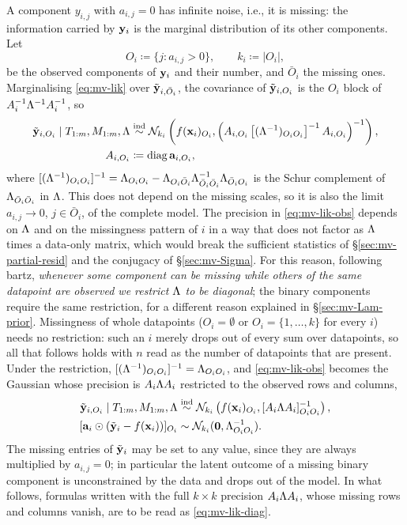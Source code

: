 A component $y_{i,j}$ with $a_{i,j} = 0$ has infinite noise, i.e., it is
missing: the information carried by $\mathbf{y}_i$ is the marginal distribution of
its other components. Let
\begin{equation}
	\label{eq:mv-Oi}
	O_i \coloneqq \{j : a_{i,j} > 0\},
	\qquad
	k_i \coloneqq |O_i|,
\end{equation}
be the observed components of $\mathbf{y}_i$ and their number, and $\bar O_i$ the
missing ones. Marginalising \eqref{eq:mv-lik} over $\tilde{\mathbf{y}}_{i,\bar O_i}$, the
covariance of $\tilde{\mathbf{y}}_{i,O_i}$ is the $O_i$ block of
$A_i^{-1}\Lambda^{-1}A_i^{-1}$, so
\begin{align}
	\label{eq:mv-lik-obs}
	\tilde{\mathbf{y}}_{i,O_i} \mid T_{1:m}, M_{1:m}, \Lambda & \stackrel{\text{ind}}{\sim}
	\mathcal{N}_{k_i}\left(f(\mathbf{x}_i)_{O_i},
	\left(A_{i,O_i}\left[(\Lambda^{-1})_{O_iO_i}\right]^{-1}A_{i,O_i}\right)^{-1}\right),
	\\
	A_{i,O_i}                              & \coloneqq \operatorname{diag}\mathbf{a}_{i,O_i},
	\notag
\end{align}
where $[(\Lambda^{-1})_{O_iO_i}]^{-1} = \Lambda_{O_iO_i} -
	\Lambda_{O_i\bar O_i}\Lambda_{\bar O_i\bar O_i}^{-1}\Lambda_{\bar O_iO_i}$ is the
Schur complement of $\Lambda_{\bar O_i\bar O_i}$ in $\Lambda$. This does not
depend on the missing scales, so it is also the limit $a_{i,j} \to 0$,
$j \in \bar O_i$, of the complete model. The precision in
\eqref{eq:mv-lik-obs} depends on $\Lambda$ and on the missingness pattern of
$i$ in a way that does not factor as $\Lambda$ times a data-only matrix, which
would break the sufficient statistics of \S\ref{sec:mv-partial-resid} and the
conjugacy of \S\ref{sec:mv-Sigma}. For this reason, following bartz,
\emph{whenever some component can be missing while others of the same
	datapoint are observed we restrict $\Lambda$ to be diagonal}; the binary
components require the same restriction, for a different reason explained in
\S\ref{sec:mv-Lam-prior}. Missingness of whole datapoints ($O_i = \emptyset$
or $O_i = \{1, \dots, k\}$ for every $i$) needs no restriction: such an $i$
merely drops out of every sum over datapoints, so all that follows holds with
$n$ read as the number of datapoints that are present. Under the
restriction,
$[(\Lambda^{-1})_{O_iO_i}]^{-1} = \Lambda_{O_iO_i}$, and \eqref{eq:mv-lik-obs}
becomes the Gaussian whose precision is $A_i\Lambda A_i$ restricted to the
observed rows and columns,
\begin{align}
	\label{eq:mv-lik-diag}
	\vyt_{i,O_i} \mid T_{1:m}, M_{1:m}, \mLam & \stackrel{\text{ind}}{\sim}
	\N_{k_i}\left(f(\vx_i)_{O_i},
	[\mA_i \mLam \mA_i]_{O_iO_i}^{-1}\right),
	\\
	[\va_i \odot (\vyt_i - f(\vx_i))]_{O_i}  & \sim
	\N_{k_i}(\mathbf{0}, \mLam_{O_iO_i}^{-1}).
	\notag
\end{align}
The missing entries of $\tilde{\mathbf{y}}_i$ may be set to any value, since they are
always multiplied by $a_{i,j} = 0$; in particular the latent outcome of a
missing binary component is unconstrained by the data and drops out of the
model. In what follows, formulas written with the full $k \times k$
precision $A_i\Lambda A_i$, whose missing rows and columns vanish, are to be
read as \eqref{eq:mv-lik-diag}.


